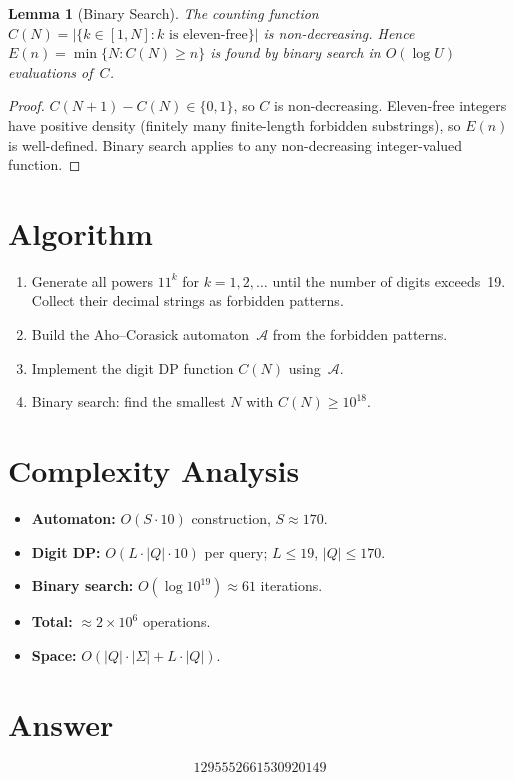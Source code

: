 \documentclass[12pt]{article}
\newtheorem{lemma}[theorem]{Lemma}
\begin{document}
\begin{lemma}[Binary Search]
The counting function $C(N) = |\{k \in [1,N] : k \text{ is eleven-free}\}|$ is non-decreasing. Hence $E(n) = \min\{N : C(N) \geq n\}$ is found by binary search in $O(\log U)$ evaluations of~$C$.
\end{lemma}

\begin{proof}
$C(N+1) - C(N) \in \{0,1\}$, so $C$ is non-decreasing. Eleven-free integers have positive density (finitely many finite-length forbidden substrings), so $E(n)$ is well-defined. Binary search applies to any non-decreasing integer-valued function.
\end{proof}

\section{Algorithm}

\begin{enumerate}
\item Generate all powers $11^k$ for $k = 1, 2, \ldots$ until the number of digits exceeds~19. Collect their decimal strings as forbidden patterns.
\item Build the Aho--Corasick automaton~$\mathcal{A}$ from the forbidden patterns.
\item Implement the digit DP function $C(N)$ using~$\mathcal{A}$.
\item Binary search: find the smallest $N$ with $C(N) \geq 10^{18}$.
\end{enumerate}

\section{Complexity Analysis}

\begin{itemize}
\item \textbf{Automaton:} $O(S \cdot 10)$ construction, $S \approx 170$.
\item \textbf{Digit DP:} $O(L \cdot |Q| \cdot 10)$ per query; $L \leq 19$, $|Q| \leq 170$.
\item \textbf{Binary search:} $O(\log 10^{19}) \approx 61$ iterations.
\item \textbf{Total:} $\approx 2 \times 10^6$ operations.
\item \textbf{Space:} $O(|Q| \cdot |\Sigma| + L \cdot |Q|)$.
\end{itemize}

\section{Answer}

\[
\boxed{1295552661530920149}
\]
\end{document}
